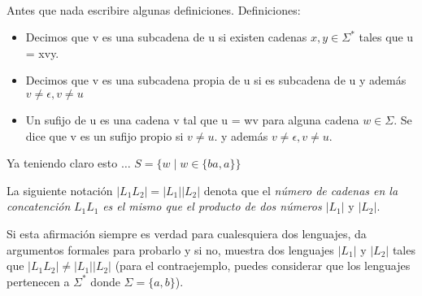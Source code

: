 \begin{questions}
\begin{solution}
    \\
    Antes que nada escribire algunas definiciones.
    Definiciones: \\
    \begin{itemize}
        \item Decimos que v es una subcadena de u si existen cadenas $x,y \in \Sigma^{*}$ tales que u = xvy.
        \item Decimos que v es una subcadena propia de u si es subcadena de u y además $v \neq \epsilon, v \neq u$
        \item Un sufijo de u es una cadena v tal que u = wv para alguna cadena $w \in \Sigma$.
        Se dice que v es un sufijo propio si $v \neq u$.
        y además $v \neq \epsilon, v \neq u$.
    \end{itemize}

    Ya teniendo claro esto $\dots$
    $S = \{ w \mid w \in \{ ba,a\}\}$
\end{solution}

\question La siguiente notaci\'on $|L_{1}L_{2}| = |L_{1}||L_{2}|$ denota que el {\it número de cadenas en la concatención}
$L_{1}L_{1}$ {\it es el mismo que el producto de dos n\'umeros $|L_{1}|$} y $|L_{2}|$.

Si esta afirmaci\'on siempre es verdad para cualesquiera dos lenguajes, da argumentos
formales para probarlo y si no, muestra dos lenguajes $|L_{1}|$ y $|L_{2}|$ tales que $|L_{1}L_{2}| \neq |L_{1}||L_{2}|$ (para el
contraejemplo, puedes considerar que los lenguajes pertenecen a $\Sigma^{*}$ donde $\Sigma = \{a,b\}$).
\end{questions}
